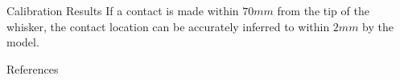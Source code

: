 \documentclass[final]{beamer}
\newlength{\sepwidth}
\newlength{\colwidth}
\newcommand{\separatorcolumn}{\begin{column}{\sepwidth}\end{column}}
\begin{document}
\begin{frame}[t]
\begin{columns}[t]
\begin{column}{\colwidth}
\begin{block}{Calibration Results}
    If a contact is made within $70 mm$ from the tip of the whisker, the contact location can be accurately inferred to within $2 mm$ by the model.
  \end{block}

  \begin{block}{References}
    \vspace{-.4cm}
    \printbibliography[heading=none]
  \end{block}

\end{column}

\separatorcolumn

\end{columns}
\end{frame}
\end{document}
